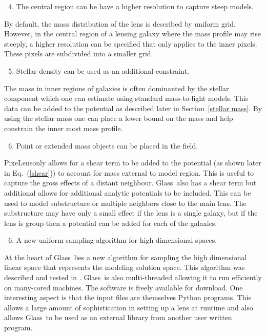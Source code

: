 \documentclass[onecolumn,galley]{mn2e}
\newcommand{\Glass}{{\sc Glass}}
\newcommand{\PixeLens}{{\sc PixeLens}}
\newcommand{\eqnref}[1] {Eq.~(\ref{#1})}
\newcommand{\secref}[1] {Section~\ref{#1}}
\begin{document}
%
\begin{enumerate}
  \setcounter{enumi}{3}
  \item The central region can be have a higher resolution to capture steep models. 
\end{enumerate}
%
By default, the mass distribution of the lens is described by uniform grid. However,
in the central region of a lensing galaxy where the mass profile may rise steeply,
a higher resolution can be specified that only applies to the inner pixels. These
pixels are subdivided into a smaller grid.
%
\begin{enumerate}
  \setcounter{enumi}{4}
  \item Stellar density can be used as an additional constraint.  
\end{enumerate}
%
The mass in inner regions of galaxies is often dominanted by the stellar component
which one can estimate using standard mass-to-light models. This data can be added
to the potential as described later in \secref{stellar mass}. By using the stellar
mass one can place a lower bound on the mass and help constrain the inner most
mass profile.
%
\begin{enumerate}
  \setcounter{enumi}{5}
  \item Point or extended mass objects can be placed in the field.
\end{enumerate}
%
\PixeLens only allows for a shear term to be added to the potential (as shown
later in \eqnref{shear}) to account for mass external to model region. This
is useful to capture the gross effects of a distant neighbour. \Glass\ also
has a shear term but additional allows for additional analytic potentials to
be included. This can be used to model substructure or multiple neighbors close
to the main lens. The substructure may have only a small effect if the lens is
a single galaxy, but if the lens is group then a potential can be added for
each of the galaxies.
%
\begin{enumerate}
  \setcounter{enumi}{5}
  \item A new uniform sampling algorithm for high dimensional spaces.
\end{enumerate}
%
At the heart of \Glass\ lies a new algorithm for sampling the high dimensional
linear space that represents the modeling solution space. This algorithm was
described and tested in \cite{}. \Glass\ is also multi-threaded allowing it to
run efficiently on many-cored machines.  The software is freely available for
download. One interesting aspect is that the input files are themselves Python
programs. This allows a large amount of sophistication in setting up a lens at
runtime and also allows \Glass\ to be used as an external library from another
user written program.
\end{document}
